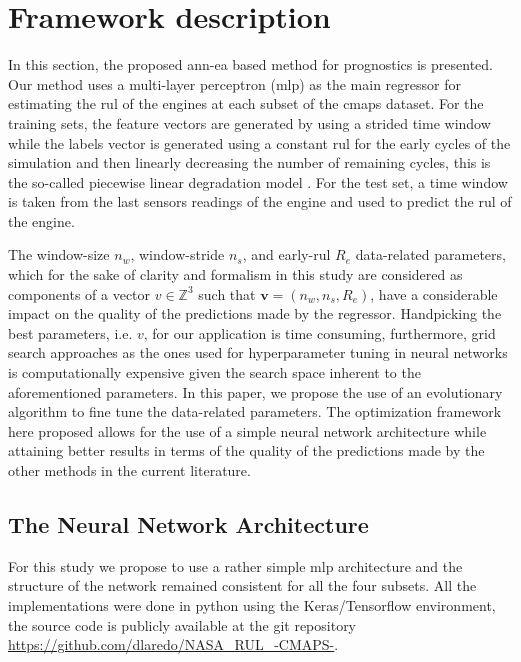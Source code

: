 \section{Framework description}
\label{sec:method}

In this section, the proposed \gls{ann}-\gls{ea} based method for prognostics is presented. Our method uses a multi-layer perceptron (\gls{mlp}) as the main regressor for estimating the \gls{rul} of the engines at each subset of the \gls{cmaps} dataset. For the training sets, the feature vectors are generated by using a strided time window while the labels vector is generated using a constant \gls{rul} for the early cycles of the simulation and then linearly decreasing the number of remaining cycles, this is the so-called piecewise linear degradation model \cite{Ramasso2014}. For the test set, a time window is taken from the last sensors readings of the engine and used to predict the \gls{rul} of the engine.

The window-size $n_w$, window-stride $n_s$, and early-\gls{rul} $R_e$ data-related parameters, which for the sake of clarity and formalism in this study are considered as components of a vector $v \in \mathbb{Z}^3$ such that $\mathbf{v} = (n_w, n_s, R_e)$, have a considerable impact on the quality of the predictions made by the regressor. Handpicking the best parameters, i.e. $v$, for our application is time consuming, furthermore, grid search approaches as the ones used for hyperparameter tuning in neural networks is computationally expensive given the search space inherent to the aforementioned parameters. In this paper, we propose the use of an evolutionary algorithm to fine tune the data-related parameters. The optimization framework here proposed allows for the use of a simple neural network architecture while attaining better results in terms of the quality of the predictions made by the other methods in the current literature.

\subsection{The Neural Network Architecture}

For this study we propose to use a rather simple \gls{mlp} architecture and the structure of the network remained consistent for all the four subsets. All the implementations were done in python using the Keras/Tensorflow environment, the source code is publicly available at the git repository \url{https://github.com/dlaredo/NASA_RUL_-CMAPS-}. 

